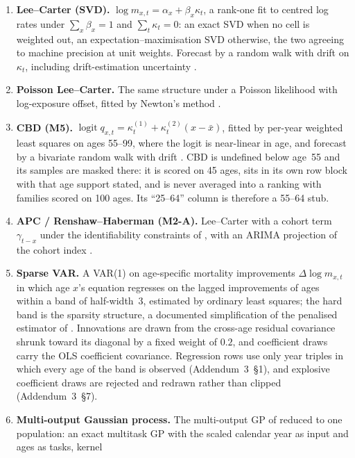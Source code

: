 \begin{enumerate}
\item \textbf{Lee--Carter (SVD).} $\log m_{x,t}=\alpha_x+\beta_x\kappa_t$, a
  rank-one fit to centred log rates under $\sum_x\beta_x=1$ and
  $\sum_t\kappa_t=0$: an exact SVD when no cell is weighted out, an
  expectation--maximisation SVD otherwise, the two agreeing to machine
  precision at unit weights. Forecast by a random walk with drift on
  $\kappa_t$, including drift-estimation uncertainty \citep{lee1992modeling}.
\item \textbf{Poisson Lee--Carter.} The same structure under a Poisson
  likelihood with log-exposure offset, fitted by Newton's method
  \citep{brouhns2002poisson}.
\item \textbf{CBD (M5).} $\operatorname{logit} q_{x,t} = \kappa^{(1)}_t +
  \kappa^{(2)}_t (x-\bar x)$, fitted by per-year weighted least squares on
  ages 55--99, where the logit is near-linear in age, and forecast by a
  bivariate random walk with drift \citep{cairns2006two}. CBD is undefined
  below age~55 and its samples are masked there: it is scored on 45 ages, sits
  in its own row block with that age support stated, and is never averaged
  into a ranking with families scored on 100 ages. Its ``25--64'' column is
  therefore a 55--64 stub.
\item \textbf{APC / Renshaw--Haberman (M2-A).} Lee--Carter with a cohort term
  $\gamma_{t-x}$ under the identifiability constraints of
  \citet{cairns2009quantitative}, with an ARIMA projection of the cohort index
  \citep{renshaw2006cohort}.
\item \textbf{Sparse VAR.} A VAR(1) on age-specific mortality improvements
  $\Delta\log m_{x,t}$ in which age $x$'s equation regresses on the lagged
  improvements of ages within a band of half-width~3, estimated by ordinary
  least squares; the hard band is the sparsity structure, a documented
  simplification of the penalised estimator of \citet{li2017coherent}.
  Innovations are drawn from the cross-age residual covariance shrunk toward
  its diagonal by a fixed weight of $0.2$, and coefficient draws carry the OLS
  coefficient covariance. Regression rows use only year triples in which every
  age of the band is observed (Addendum~3~\S1), and explosive coefficient
  draws are rejected and redrawn rather than clipped (Addendum~3~\S7).
\item \textbf{Multi-output Gaussian process.} The multi-output GP of
  \citet{huynh2021multi} reduced to one population: an exact multitask GP with
  the scaled calendar year as input and ages as tasks, kernel

\end{enumerate}
